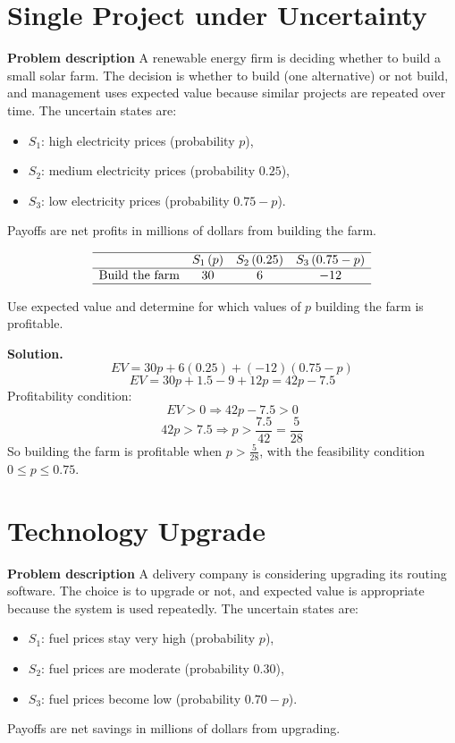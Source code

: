 	\begin{ExamProblems}
		
		\hypertarget{c7-cu-ex1}{}
		\item
		\section{Single Project under Uncertainty}
		
		\textbf{Problem description}
		A renewable energy firm is deciding whether to build a small solar farm. The decision is whether to build (one alternative) or not build, and management uses expected value because similar projects are repeated over time. The uncertain states are:
		\begin{itemize}
			\item \(S_1\): high electricity prices (probability \(p\)),
			\item \(S_2\): medium electricity prices (probability \(0.25\)),
			\item \(S_3\): low electricity prices (probability \(0.75-p\)).
		\end{itemize}
		Payoffs are net profits in millions of dollars from building the farm.
		
		\[
		\begin{array}{lccc}
			\hline
			& S_1\,(p) & S_2\,(0.25) & S_3\,(0.75-p) \\
			\hline
			\text{Build the farm} & 30 & 6 & -12 \\
			\hline
		\end{array}
		\]
		
		Use expected value and determine for which values of \(p\) building the farm is profitable.
		
		\textbf{Solution.}
		\[
		EV=30p+6(0.25)+(-12)(0.75-p)
		\]
		\[
		EV=30p+1.5-9+12p=42p-7.5
		\]
		Profitability condition:
		\[
		EV>0\Rightarrow 42p-7.5>0
		\]
		\[
		42p>7.5\Rightarrow p>\frac{7.5}{42}=\frac{5}{28}
		\]
		So building the farm is profitable when \(p>\frac{5}{28}\), with the feasibility condition \(0\le p\le0.75\).
		
		
		\hypertarget{c7-cu-ex2}{}
		\item
		\section{Technology Upgrade}
		
		\textbf{Problem description}
		A delivery company is considering upgrading its routing software. The choice is to upgrade or not, and expected value is appropriate because the system is used repeatedly. The uncertain states are:
		\begin{itemize}
			\item \(S_1\): fuel prices stay very high (probability \(p\)),
			\item \(S_2\): fuel prices are moderate (probability \(0.30\)),
			\item \(S_3\): fuel prices become low (probability \(0.70-p\)).
		\end{itemize}
		Payoffs are net savings in millions of dollars from upgrading.
		

\end{ExamProblems}

